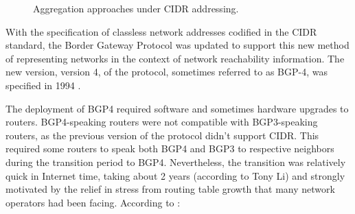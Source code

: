 \begin{figure}
\begin{centering}
\caption{Aggregation approaches under CIDR addressing.}
\label{fig:cidr_agg}
\end{centering}
\end{figure}

With the specification of classless network addresses codified in the CIDR standard, the Border Gateway Protocol was updated to support this new method of representing networks in the context of network reachability information. The new version, version 4, of the protocol, sometimes referred to as BGP-4, was specified in 1994 \cite{rfc1654}.

The deployment of BGP4 required software and sometimes hardware upgrades to routers. BGP4-speaking routers were not compatible with BGP3-speaking routers, as the previous version of the protocol didn't support CIDR. This required some routers to speak both BGP4 and BGP3 to respective neighbors during the transition period to BGP4. Nevertheless, the transition was relatively quick in Internet time, taking about 2 years (according to Tony Li) and strongly motivated by the relief in stress from routing table growth that many network operators had been facing. According to \cite{rfc1773}:

